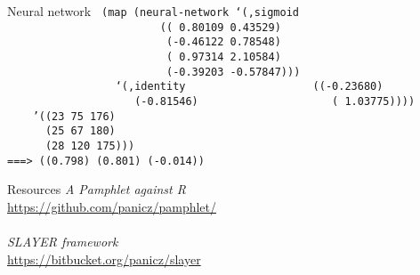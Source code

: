 \documentclass{beamer}
\begin{document}
\begin{frame}{Neural network}
  \texttt{
    (map (neural-network `(,sigmoid \\
    \ \ \ \ \ \ \ \ \ \ \ \ \ \ \ \ \ \ \ \ \ \ \ \ (( 0.80109  0.43529) \\
    \ \ \ \ \ \ \ \ \ \ \ \ \ \ \ \ \ \ \ \ \ \ \ \ \ (-0.46122  0.78548)\\
    \ \ \ \ \ \ \ \ \ \ \ \ \ \ \ \ \ \ \ \ \ \ \ \ \ ( 0.97314  2.10584)\\
    \ \ \ \ \ \ \ \ \ \ \ \ \ \ \ \ \ \ \ \ \ \ \ \ \ (-0.39203 -0.57847)))\\
    \ \ \ \ \ \ \ \ \ \ \ \ \ \ \ \ \ `(,identity \\
    \ \ \ \ \ \ \ \ \ \ \ \ \ \ \ \ \ \ \ ((-0.23680)\\
    \ \ \ \ \ \ \ \ \ \ \ \ \ \ \ \ \ \ \ \ (-0.81546)\\
    \ \ \ \ \ \ \ \ \ \ \ \ \ \ \ \ \ \ \ \ ( 1.03775))))\\
    \ \ \ \ '((23  75 176) \\
    \ \ \ \ \ \ (25  67 180) \\
    \ \ \ \ \ \ (28 120 175))) \\ \pause
    ===> ((0.798) (0.801) (-0.014))
  }
\end{frame}

\begin{frame}{Resources}
  \textit{A Pamphlet against R} \\
  \url{https://github.com/panicz/pamphlet/} \\ \pause
  \ \\
  \textit{SLAYER framework} \\ 
  \url{https://bitbucket.org/panicz/slayer}
\end{frame}



\end{document}
